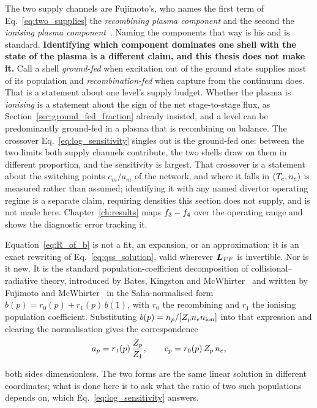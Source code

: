 The two supply channels are Fujimoto's, who names the first term of
Eq.~\eqref{eq:two_supplies} the \emph{recombining plasma component} and the
second the \emph{ionising plasma component}~\cite[Sec.~4.1]{Fujimoto2004}.
Naming the components that way is his and is standard. \textbf{Identifying which
component dominates one shell with the state of the plasma is a different claim,
and this thesis does not make it.} Call a shell \emph{ground-fed} when
excitation out of the ground state supplies most of its population and
\emph{recombination-fed} when capture from the continuum does. That is a
statement about one level's supply budget. Whether the plasma is \emph{ionising}
is a statement about the sign of the net stage-to-stage flux, as
Section~\ref{sec:ground_fed_fraction} already insisted, and a level can be
predominantly ground-fed in a plasma that is recombining on balance. The
crossover Eq.~\eqref{eq:log_sensitivity} singles out is the ground-fed one:
between the two limits both supply channels contribute, the two shells draw on
them in different proportion, and the sensitivity is largest. That crossover
is a statement about the switching points $c_m/a_m$ of the network, and where it
falls in $(T_e,n_e)$ is measured rather than assumed; identifying it with any
named divertor operating regime is a separate claim, requiring densities this
section does not supply, and is not made here.
Chapter~\ref{ch:results} maps $f_{3} - f_{4}$ over the operating range
and shows the diagnostic error tracking it.

Equation~\eqref{eq:R_of_b} is not a fit, an expansion, or an approximation:
it is an exact rewriting of
Eq.~\eqref{eq:qss_solution}, valid wherever $\bm{L}_{FF}$ is invertible.
Nor is it new. It is the standard population-coefficient decomposition of
collisional--radiative theory, introduced by Bates, Kingston and
McWhirter~\cite{Bates1962}
and written by Fujimoto and
McWhirter~\cite{FujimotoMcWhirter1990}
in the Saha-normalised form
$b(p) = r_0(p) + r_1(p)\,b(1)$, with $r_0$ the recombining and $r_1$ the
ionising population coefficient. Substituting
$b(p) = n_p/[Z_{p}n_en_{\mathrm{ion}}]$ into that expression and clearing the
normalisation gives the correspondence
\begin{equation}
  a_p = r_1(p)\,\frac{Z_{p}}{Z_{1}},
  \qquad
  c_p = r_0(p)\,Z_{p}\,n_e ,
  \label{eq:fujimoto_correspondence}
\end{equation}

\noindent both sides dimensionless. The two forms are the same linear solution
in different coordinates; what is done here is to ask what the ratio of two such
populations depends on, which Eq.~\eqref{eq:log_sensitivity} answers.

